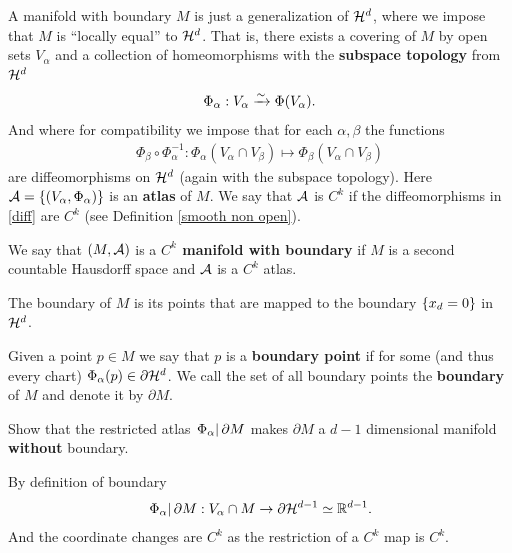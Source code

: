 \documentclass[
    a4paper,
    DIV=14,
    abstract=true,
    numbers=noenddot
]{scrartcl}
\begin{document}
A manifold with boundary $M$ is just a generalization of $\mathcal{H}^d$, where we impose that $M$ is ``locally equal'' to $\mathcal{H}^d$. That is, there exists a covering of $M$ by open sets  $V_\alpha$ and a collection of homeomorphisms with the \textbf{subspace topology} from $\mathcal{H}^d$
\begin{align}\label{chart}
	\Phi_\alpha : V_\alpha \xrightarrow{\sim}  \Phi(V_\alpha).
\end{align}
And where for compatibility we impose that for each $\alpha,\beta $ the functions
\begin{align}\label{diff}
	\Phi_\beta \circ\Phi_\alpha^{-1}: \Phi_\alpha(V_\alpha\cap V_\beta ) \longmapsto \Phi_\beta (V_\alpha\cap V_\beta )
\end{align}
are diffeomorphisms on $\mathcal{H}^d$ (again with the subspace topology). Here $\mathcal{A}=\left\{(V_\alpha,\Phi_\alpha)\right\} $ is an \textbf{atlas} of $M$. We say that $\mathcal{A}$ is $C^k$ if the diffeomorphisms in \eqref{diff} are $C^k$ (see Definition \ref{smooth non open}).

\begin{definition}
	We say that $(M,\mathcal{A})$ is a \textbf{$C^k$ manifold with boundary} if $M$ is a second countable Hausdorff space and $\mathcal{A}$ is a $C^k$ atlas.
\end{definition}
The boundary of $M$ is its points that are mapped to the boundary $\left\{x_d=0\right\} $ in $\mathcal{H}^d$.
\begin{definition}
	Given a point $p \in M$ we say that $p$ is a \textbf{boundary point} if for some (and thus every chart) $\Phi_\alpha(p) \in \partial \mathcal{H} ^{d}$. We call the set of all boundary points the \textbf{boundary} of $M$ and denote it by $\partial M$.
\end{definition}
\begin{exercise}
	Show that the restricted atlas $\left.\Phi_\alpha\right|{\partial M}$ makes $\partial M$ a $d-1$ dimensional manifold \textbf{without} boundary.
\end{exercise}
\begin{hint}
	By definition of boundary
	\begin{align}\label{chart2}
		\left.\Phi_\alpha\right|{\partial M}: V_\alpha \cap M \to \partial \mathcal{H}^{d-1} \simeq \mathbb{R}^{d-1}.
	\end{align}
	And the coordinate changes are $C^k$ as the restriction of a $C^k$ map is $C^k$.
\end{hint}
\end{document}
